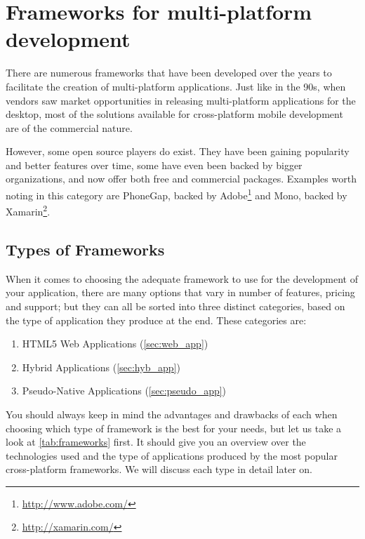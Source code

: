 \chapter{Frameworks for multi-platform development}\label{ch:frameworks}


There are numerous frameworks that have been developed over the years to facilitate the creation of multi-platform applications. Just like in the 90s, when vendors saw market opportunities in releasing multi-platform applications for the desktop, most of the solutions available for cross-platform mobile development are of the commercial nature.


However,  some open source players do exist. They have been gaining popularity and better features over time, some have even been backed by bigger organizations, and now offer both free and commercial packages. Examples worth noting in this category are PhoneGap, backed by Adobe\footnote{\url{http://www.adobe.com/}} and Mono, backed by Xamarin\footnote{\url{http://xamarin.com/}}.

\section{Types of Frameworks}
When it comes to choosing the adequate framework to use for the development of your application, there are many options that vary in number of features, pricing and support; but they can all be sorted into three distinct categories, based on the type of application they produce at the end. These categories are:
\begin{enumerate}
    \item HTML5 Web Applications (\autoref{sec:web_app})
    \item Hybrid Applications (\autoref{sec:hyb_app})
    \item Pseudo-Native Applications (\autoref{sec:pseudo_app})
\end{enumerate}

You should always keep in mind the advantages and drawbacks of each when choosing which type of framework is the best for your needs, but let us take a look at \autoref{tab:frameworks} first. It should give you an overview over the technologies used and the type of applications produced by the most popular cross-platform frameworks. We will discuss each type in detail later on.\newline

